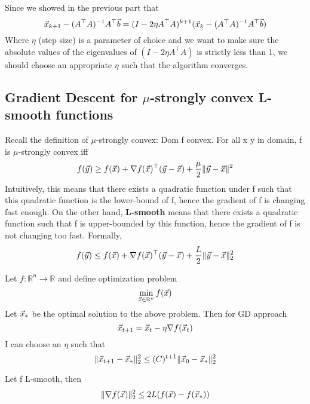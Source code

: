\begin{example}[GD on LS continued]
	Since we showed in the previous part that
	\[
\vec{x}_{k+1} - (A^\top A)^{-1}A^\top\vec{b} = (I-2\eta A^\top A)^{k+1}(\vec{x}_k - (A^\top A)^{-1}A^\top\vec{b})
	\]
	Where $\eta$ (step size) is a parameter of choice and we want to make sure the absolute values of the eigenvalues of $(I-2\eta A^\top A)$ is strictly less than 1, we should choose an appropriate $\eta$ such that the algorithm converges. 
\end{example}


\subsection{Gradient Descent for $\mu$-strongly convex L-smooth functions} %
\label{sub:gradient_descent_for_}

\begin{definition}
	Recall the definition of $\mu$-strongly convex: Dom f convex. For all x y in domain, f is $\mu$-strongly convex iff
	\[
f(\vec{y})\ge f(\vec{x})+\nabla f(\vec{x})^\top(\vec{y}-\vec{x}) + \frac{\mu}{2}\|\vec{y}-\vec{x}\|^2
	\]
	Intuitively, this means that there exists a quadratic function under f such that this quadratic function is the lower-bound of f, hence the gradient of f is changing fast enough. On the other hand, \textbf{L-smooth} means that there exists a quadratic function such that f is upper-bounded by this function, hence the gradient of f is not changing too fast. Formally,
	\[
f(\vec{y})\le f(\vec{x})+\nabla f(\vec{x})^\top(\vec{y}-\vec{x}) + \frac{L}{2}\|\vec{y}-\vec{x}\|_2^2
	\]
\end{definition}

\begin{theorem}
	Let $f:\mathbb{R}^n\rightarrow\mathbb{R}$ and define optimization problem
	\[
\min_{\vec{x}\in\mathbb{R}^n}f(\vec{x})
	\]
	Let $\vec{x}_*$ be the optimal solution to the above problem. Then for GD approach
	\[
\vec{x}_{t+1} = \vec{x}_t-\eta\nabla f(\vec{x}_t)
	\]
	I can choose an $\eta$ such that
	\[
\|\vec{x}_{t+1}-\vec{x}_*\|_2^2 \le (C)^{t+1}\|\vec{x}_0-\vec{x}_*\|_2^2
	\]
\end{theorem}

\begin{lemma}
	Let f L-smooth, then
	\[
\|\nabla f(\vec{x})\|_2^2\le 2L(f(\vec{x})-f(\vec{x}_*))
	\]
\end{lemma}


